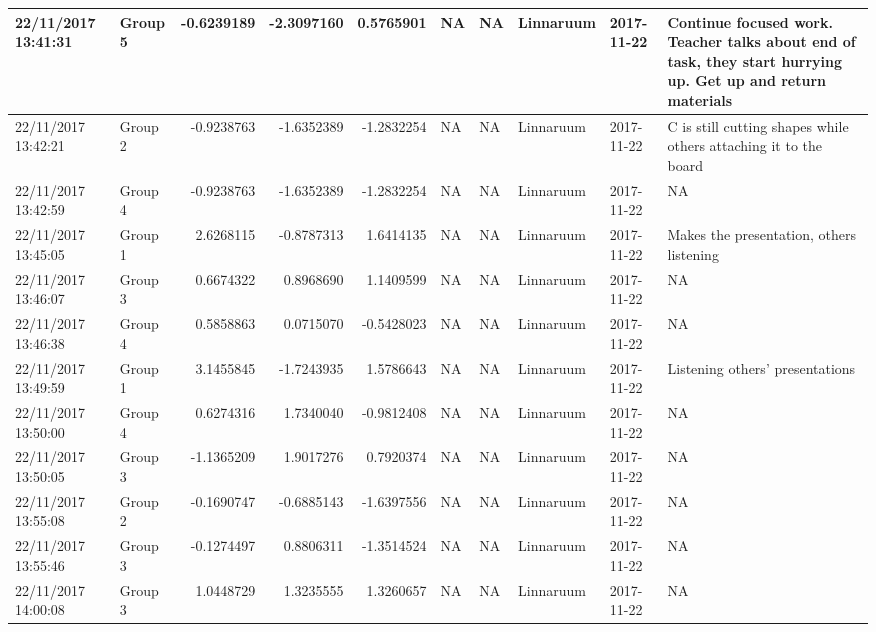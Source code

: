 \documentclass[]{article}
\begin{document}
\begin{tabular}{l|l|r|r|r|l|l|l|l|l}
\hline
22/11/2017 13:41:31 & Group 5 & -0.6239189 & -2.3097160 & 0.5765901 & NA & NA & Linnaruum & 2017-11-22 & Continue focused work. Teacher talks about end of task, they start hurrying up. Get up and return materials\\
\hline
22/11/2017 13:42:21 & Group 2 & -0.9238763 & -1.6352389 & -1.2832254 & NA & NA & Linnaruum & 2017-11-22 & C is still cutting shapes while others attaching it to the board\\
\hline
22/11/2017 13:42:59 & Group 4 & -0.9238763 & -1.6352389 & -1.2832254 & NA & NA & Linnaruum & 2017-11-22 & NA\\
\hline
22/11/2017 13:45:05 & Group 1 & 2.6268115 & -0.8787313 & 1.6414135 & NA & NA & Linnaruum & 2017-11-22 & Makes the presentation, others listening\\
\hline
22/11/2017 13:46:07 & Group 3 & 0.6674322 & 0.8968690 & 1.1409599 & NA & NA & Linnaruum & 2017-11-22 & NA\\
\hline
22/11/2017 13:46:38 & Group 4 & 0.5858863 & 0.0715070 & -0.5428023 & NA & NA & Linnaruum & 2017-11-22 & NA\\
\hline
22/11/2017 13:49:59 & Group 1 & 3.1455845 & -1.7243935 & 1.5786643 & NA & NA & Linnaruum & 2017-11-22 & Listening others’ presentations\\
\hline
22/11/2017 13:50:00 & Group 4 & 0.6274316 & 1.7340040 & -0.9812408 & NA & NA & Linnaruum & 2017-11-22 & NA\\
\hline
22/11/2017 13:50:05 & Group 3 & -1.1365209 & 1.9017276 & 0.7920374 & NA & NA & Linnaruum & 2017-11-22 & NA\\
\hline
22/11/2017 13:55:08 & Group 2 & -0.1690747 & -0.6885143 & -1.6397556 & NA & NA & Linnaruum & 2017-11-22 & NA\\
\hline
22/11/2017 13:55:46 & Group 3 & -0.1274497 & 0.8806311 & -1.3514524 & NA & NA & Linnaruum & 2017-11-22 & NA\\
\hline
22/11/2017 14:00:08 & Group 3 & 1.0448729 & 1.3235555 & 1.3260657 & NA & NA & Linnaruum & 2017-11-22 & NA\\
\hline
\end{tabular}
\end{document}
